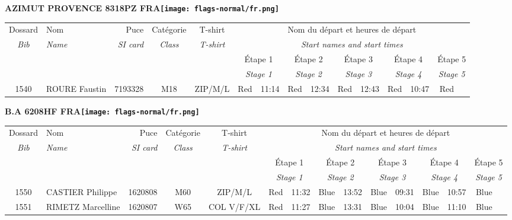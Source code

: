 \documentclass{report}
\begin{document}
\newpage
  \Huge \centering \bfseries AZIMUT PROVENCE 8318PZ FRA\normalfont \footnotesize \sffamily \hfill \texttt{[image: flags-normal/fr.png]} \newline 
  \begin{longtable}{|c|l|r|c|c|*{5}{cc|}}
    Dossard & Nom  & Puce    & Catégorie & T-shirt & \multicolumn{10}{c|}{Nom du départ et heures de départ} \\
    \itshape Bib     & \itshape Name & \itshape SI card & \itshape Class  & \itshape  T-shirt  & \multicolumn{10}{c|}{\itshape Start names and start times} \\
    \hline
    & & & & & \multicolumn{2}{c|}{Étape 1} & \multicolumn{2}{c|}{Étape 2} & \multicolumn{2}{c|}{Étape 3} & \multicolumn{2}{c|}{Étape 4} & \multicolumn{2}{c|}{Étape 5} \\
    & & & & & \multicolumn{2}{c|}{\itshape Stage 1} & \multicolumn{2}{c|}{\itshape Stage 2} & \multicolumn{2}{c|}{\itshape Stage 3} & \multicolumn{2}{c|}{\itshape Stage 4} & \multicolumn{2}{c|}{\itshape Stage 5} \\
    \hline
    1540 & ROURE Faustin & 7193328 & M18 & ZIP/M/L & Red & 11:14 & Red & 12:34 & Red & 12:43 & Red & 10:47 & Red &  \\
  \end{longtable}
\newpage
  \Huge \centering \bfseries B.A 6208HF FRA\normalfont \footnotesize \sffamily \hfill \texttt{[image: flags-normal/fr.png]} \newline 
  \begin{longtable}{|c|l|r|c|c|*{5}{cc|}}
    Dossard & Nom  & Puce    & Catégorie & T-shirt & \multicolumn{10}{c|}{Nom du départ et heures de départ} \\
    \itshape Bib     & \itshape Name & \itshape SI card & \itshape Class  & \itshape  T-shirt  & \multicolumn{10}{c|}{\itshape Start names and start times} \\
    \hline
    & & & & & \multicolumn{2}{c|}{Étape 1} & \multicolumn{2}{c|}{Étape 2} & \multicolumn{2}{c|}{Étape 3} & \multicolumn{2}{c|}{Étape 4} & \multicolumn{2}{c|}{Étape 5} \\
    & & & & & \multicolumn{2}{c|}{\itshape Stage 1} & \multicolumn{2}{c|}{\itshape Stage 2} & \multicolumn{2}{c|}{\itshape Stage 3} & \multicolumn{2}{c|}{\itshape Stage 4} & \multicolumn{2}{c|}{\itshape Stage 5} \\
    \hline
    1550 & CASTIER Philippe & 1620808 & M60 & ZIP/M/L & Red & 11:32 & Blue & 13:52 & Blue & 09:31 & Blue & 10:57 & Blue &  \\
    1551 & RIMETZ Marcelline & 1620807 & W65 & COL V/F/XL & Red & 11:27 & Blue & 13:31 & Blue & 10:04 & Blue & 11:10 & Blue &  \\
  \end{longtable}
\end{document}
